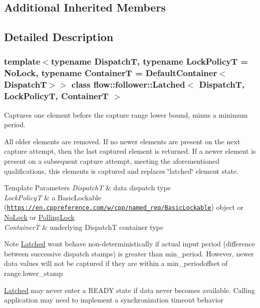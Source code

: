 \subsection*{Additional Inherited Members}


\subsection{Detailed Description}
\subsubsection*{template$<$typename DispatchT, typename Lock\+PolicyT = No\+Lock, typename ContainerT = Default\+Container$<$\+Dispatch\+T$>$$>$\newline
class flow\+::follower\+::\+Latched$<$ Dispatch\+T, Lock\+Policy\+T, Container\+T $>$}

Captures one element before the capture range lower bound, minus a minimum period. 

All older elements are removed. If no newer elements are present on the next capture attempt, then the last captured element is returned. If a newer element is present on a subsequent capture attempt, meeting the aforementioned qualifications, this elements is captured and replaces \char`\"{}latched\char`\"{} element state.


\begin{DoxyTemplParams}{Template Parameters}
{\em DispatchT} & data dispatch type \\
\hline
{\em Lock\+PolicyT} & a Basic\+Lockable (\href{https://en.cppreference.com/w/cpp/named_req/BasicLockable}{\tt https\+://en.\+cppreference.\+com/w/cpp/named\+\_\+req/\+Basic\+Lockable}) object or \hyperlink{structflow_1_1_no_lock}{No\+Lock} or \hyperlink{structflow_1_1_polling_lock}{Polling\+Lock} \\
\hline
{\em ContainerT} & underlying {\ttfamily DispatchT} container type\\
\hline
\end{DoxyTemplParams}
\begin{DoxyNote}{Note}
\hyperlink{classflow_1_1follower_1_1_latched}{Latched} won\textquotesingle{}t behave non-\/deterministically if actual input period (difference between successive dispatch stamps) is greater than {\ttfamily min\+\_\+period}. However, newer data values will not be captured if they are within a {\ttfamily min\+\_\+period{\ttfamily  offset of {\ttfamily range.\+lower\+\_\+stamp}}}
\end{DoxyNote}
\hyperlink{classflow_1_1follower_1_1_latched}{Latched} may never enter a R\+E\+A\+DY state if data never becomes available. Calling application may need to implement a synchronization timeout behavior 

